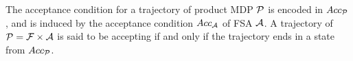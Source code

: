 \documentclass[conference]{IEEEtran}
\newcommand{\sofie}[1]{{\color{purple} [Sofie] #1}}
\begin{document}



The acceptance condition for a trajectory of product MDP $\mathcal{P}$ is encoded in
$Acc_{\mathcal{P}}$, and is induced by the acceptance condition $Acc_{\mathcal{A}}$ of
FSA $\mathcal{A}$.
A trajectory of $\mathcal{P} = \mathcal{F} \times \mathcal{A}$ is said to be accepting
if and only if the trajectory ends in a state from $Acc_{\mathcal{P}}$. 

\end{document}
